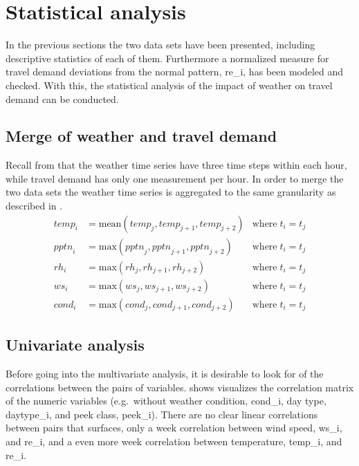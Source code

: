 
\section{Statistical analysis}
In the previous sections the two data sets have been presented, including descriptive statistics of each of them. Furthermore a normalized measure for travel demand deviations from the normal pattern, \gls{re_i}, has been modeled and checked. With this, the statistical analysis of the impact of weather on travel demand can be conducted.

\subsection{Merge of weather and travel demand}
Recall from  that the weather time series have three time steps within each hour, while travel demand has only one measurement per hour. In order to merge the two data sets the weather time series is aggregated to the same granularity as described in .
\begin{align}
	\mathit{temp}_i &= \mathrm{mean}(\mathit{temp}_j, \mathit{temp}_{j + 1}, \mathit{temp}_{j + 2}) &\text{where} \; t_i = t_j \\
	\mathit{pptn}_i &= \mathrm{max}(\mathit{pptn}_j, \mathit{pptn}_{j + 1}, \mathit{pptn}_{j + 2}) &\text{where} \; t_i = t_j \\
	\mathit{rh}_i &= \mathrm{max}(\mathit{rh}_j, \mathit{rh}_{j + 1}, \mathit{rh}_{j + 2}) &\text{where} \; t_i = t_j \\
	\mathit{ws}_i &= \mathrm{max}(\mathit{ws}_j, \mathit{ws}_{j + 1}, \mathit{ws}_{j + 2}) &\text{where} \; t_i = t_j \\
	\mathit{cond}_i &= \mathrm{max}(\mathit{cond}_j, \mathit{cond}_{j + 1}, \mathit{cond}_{j + 2}) &\text{where} \; t_i = t_j 
	\label{eq:weather_aggr}
\end{align}

\subsection{Univariate analysis}
Before going into the multivariate analysis, it is desirable to look for  of the correlations between the pairs of variables.  shows visualizes the correlation matrix of the numeric variables (e.g.\ without weather condition, \gls{cond_i}, day type, \gls{daytype_i}, and peek class, \gls{peek_i}). There are no clear linear correlations between pairs that surfaces, only a week correlation between wind speed, \gls{ws_i}, and \gls{re_i}, and a even more week correlation between temperature, \gls{temp_i}, and \gls{re_i}. 

